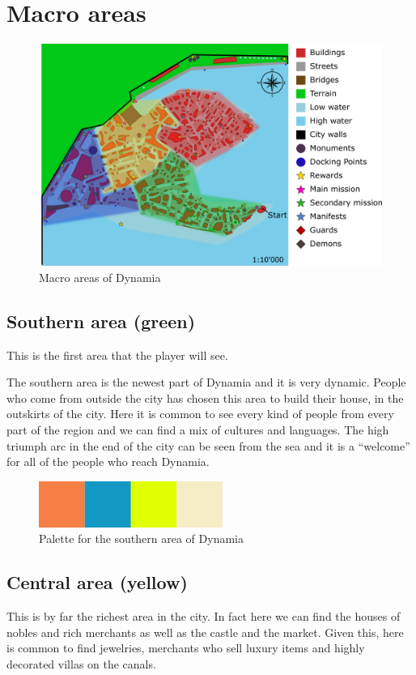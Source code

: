 \section{Macro areas}

\begin{figure}[H]
  \centering
  \includegraphics[width=\textwidth]{Images/Maps/dynamiaAreas}
  \caption{Macro areas of Dynamia}
\end{figure}

\subsection{Southern area (green)}
This is the first area that the player will see.

The southern area is the newest part of Dynamia and it is very dynamic. People who come from outside the city has chosen this area to build their house, in the outskirts of the city. Here it is common to see every kind of people from every part of the region and we can find a mix of cultures and languages. The high triumph arc in the end of the city can be seen from the sea and it is a \enquote{welcome} for all of the people who reach Dynamia.

\begin{figure}[H]
  \centering
  \includegraphics[width=6cm]{Images/Palettes/dynamiaSouthernArea}
  \caption{Palette for the southern area of Dynamia}
\end{figure}

\subsection{Central area (yellow)}
This is by far the richest area in the city. In fact here we can find the houses of  nobles and rich merchants as well as the castle and the market. Given this, here is common to find jewelries, merchants who sell luxury items and highly decorated villas on the canals.

